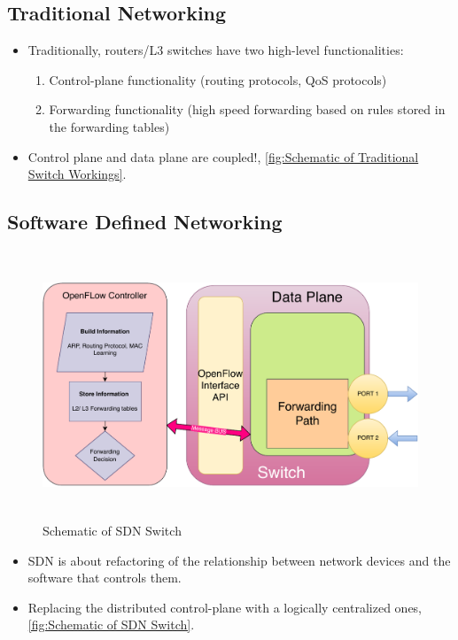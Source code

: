 \documentclass[12pt,letterpaper]{article}
\begin{document}
    \subsection{Traditional Networking}

    \begin{itemize}
        \item  Traditionally, routers/L3 switches have two high-level functionalities:
        \begin{enumerate}
            \item Control-plane functionality (routing protocols, QoS protocols)
            \item Forwarding functionality (high speed forwarding based on rules stored in the forwarding tables)
        \end{enumerate}
        \item Control plane and data plane are coupled!, \autoref{fig:Schematic of Traditional Switch Workings}.

    \end{itemize}


    \subsection{Software Defined Networking}

    \begin{figure}[h]
        \centering
        \includegraphics[height=8cm]{images/schematicSDNSw.drawio.pdf}
        \caption{Schematic of SDN Switch}
        \label{fig:Schematic of SDN Switch}
    \end{figure}

    \begin{itemize}
        \item SDN is about refactoring of the relationship between network devices and the software that controls them. 

        \item Replacing the distributed control-plane with a logically centralized ones, \autoref{fig:Schematic of SDN Switch}.
    \end{itemize}
\end{document}
